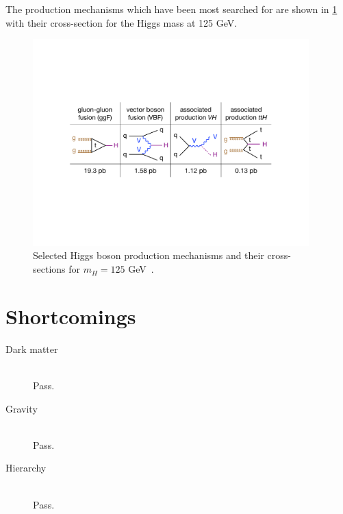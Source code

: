 The production mechanisms which have been most searched for are shown in \cref{fig:sm-higgs-diagrams} with their cross-section for the Higgs mass at 125 GeV.

\begin{figure}[tp]
  \centering
  \includegraphics[width=0.95\textwidth]{figures/standardmodel/higgsproductions}
  \caption{Selected Higgs boson production mechanisms and their cross-sections for $m_H \!=\! 125$ GeV~\cite{2013.lhchxswg}.}
  \label{fig:sm-higgs-diagrams}
\end{figure}

\section{Shortcomings}

\begin{description}
    \item[Dark matter] \hfill \\
      Pass.
    \item[Gravity]     \hfill \\
      Pass.
    \item[Hierarchy]   \hfill \\
      Pass.
\end{description}


